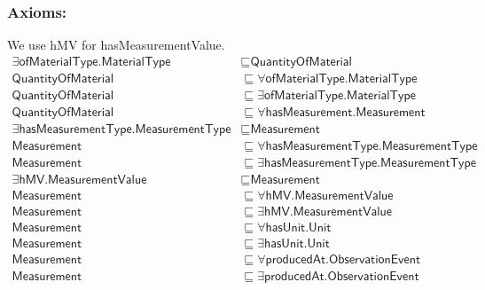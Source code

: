 \subsubsection*{Axioms:}
We use hMV for hasMeasurementValue.
\begin{align}
    \exists\textsf{ofMaterialType.MaterialType} &\sqsubseteq \textsf{QuantityOfMaterial}\\
    \textsf{QuantityOfMaterial} &\sqsubseteq \forall\textsf{ofMaterialType.MaterialType}\\
    \textsf{QuantityOfMaterial} &\sqsubseteq \exists\textsf{ofMaterialType.MaterialType}\\
    \textsf{QuantityOfMaterial} &\sqsubseteq \forall\textsf{hasMeasurement.Measurement}\\
    \exists\textsf{hasMeasurementType.MeasurementType} &\sqsubseteq \textsf{Measurement}\\ \textsf{Measurement} &\sqsubseteq \forall\textsf{hasMeasurementType.MeasurementType}\\ \textsf{Measurement} &\sqsubseteq \exists\textsf{hasMeasurementType.MeasurementType}\\
    \exists\textsf{hMV.MeasurementValue} &\sqsubseteq \textsf{Measurement}\\
    \textsf{Measurement} &\sqsubseteq \forall\textsf{hMV.MeasurementValue}\\
    \textsf{Measurement} &\sqsubseteq \exists\textsf{hMV.MeasurementValue}\\
    \textsf{Measurement} &\sqsubseteq \forall\textsf{hasUnit.Unit}\\
    \textsf{Measurement} &\sqsubseteq \exists\textsf{hasUnit.Unit}\\
    \textsf{Measurement} &\sqsubseteq \forall\textsf{producedAt.ObservationEvent}\\
    \textsf{Measurement} &\sqsubseteq \exists\textsf{producedAt.ObservationEvent}
\end{align}

